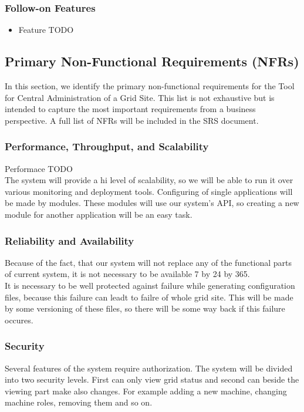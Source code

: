 \documentclass[12pt]{article}
\begin{document}
\subsubsection{Follow-on Features}
\begin{itemize}
\item Feature TODO
\end{itemize}

\subsection{Primary Non-Functional Requirements (NFRs)}
In this section, we identify the primary non-functional requirements for the Tool for Central Administration of a Grid Site. This list is not exhaustive but is intended to capture the most important requirements from a business perspective. A full list of NFRs will be included in the SRS document.

\subsubsection{Performance, Throughput, and Scalability}
Performace TODO\\
The system will provide a hi level of scalability, so we will be able to run it over various monitoring and deployment tools. Configuring of single applications will be made by modules. These modules will use our system's API, so creating a new module for another application will be an easy task.

\subsubsection{Reliability and Availability}
Because of the fact, that our system will not replace any of the functional parts of current system, it is not necessary to be available 7 by 24 by 365.\\
It is necessary to be well protected against failure while generating configuration files, because this failure can leadt to failre of whole grid site. This will be made by some versioning of these files, so there will be some way back if this failure occures.

\subsubsection{Security}
Several features of the system require authorization. The system will be divided into two security levels. First can only view grid status and second can beside the viewing part make also changes. For example adding a new machine, changing machine roles, removing them and so on.
\end{document}
